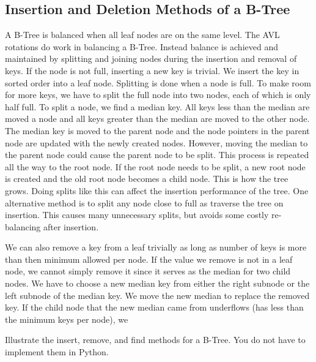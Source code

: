 \subsection*{Insertion and Deletion Methods of a B-Tree}
A B-Tree is balanced when all leaf nodes are on the same level.
The AVL rotations do work in balancing a B-Tree.
Instead balance is achieved and maintained by splitting and joining nodes during the insertion and removal of keys.
If the node is not full, inserting a new key is trivial.
We insert the key in sorted order into a leaf node.
Splitting is done when a node is full.  To make room for more keys, we have to split the full node into two nodes, each of which is only half full.
To split a node, we find a median key. 
All keys less than the median are moved a node and all keys greater than the median are moved to the other node.  
The median key is moved to the parent node and the node pointers in the parent node are updated with the newly created nodes.
However, moving the median to the parent node could cause the parent node to be split.  This process is repeated all the way to the root node.
If the root node needs to be split, a new root node is created and the old root node becomes a child node.  This is how the tree grows.
Doing splits like this can affect the insertion performance of the tree.
One alternative method is to split any node close to full as traverse the tree on insertion.  This causes many unnecessary splits, but avoids some costly re-balancing after insertion.

We can also remove a key from a leaf trivially as long as number of keys is more than then minimum allowed per node.
If the value we remove is not in a leaf node, we cannot simply remove it since it serves as the median for two child nodes.
We have to choose a new median key from either the right subnode or the left subnode of the median key.  We move the new median to replace the removed key.  If the child node that the new median came from underflows (has less than the minimum keys per node), we 

\begin{problem}
Illustrate the insert, remove, and find methods for a B-Tree.  You do not have to implement them in Python.
\end{problem}
